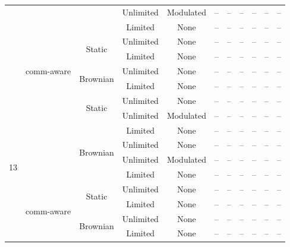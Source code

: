 \documentclass[conference]{IEEEtran}
\begin{document}
\begin{table}[ht]
\begin{tabular}{c|c|c|c|c|c|c|c|c|c|c}
  &   &          & Unlimited & Modulated & -- & -- & -- & -- & -- & -- \\
  &   &          & Limited   & None      & -- & -- & -- & -- & -- & -- \\
  \cmidrule{2-11}
  & \multirow{5}{*}{comm-aware}
    & \multirow{2}{*}{Static}
                 & Unlimited & None      & -- & -- & -- & -- & -- & -- \\
  &   &          & Limited   & None      & -- & -- & -- & -- & -- & -- \\
  \cmidrule{3-11}
  &   & \multirow{2}{*}{Brownian}
                 & Unlimited & None      & -- & -- & -- & -- & -- & -- \\
  &   &          & Limited   & None      & -- & -- & -- & -- & -- & -- \\
\midrule
\multirow{10}{*}{13}
  & \multirow{5}{*}{Stochastic}
    & \multirow{2}{*}{Static}
                 & Unlimited & None      & -- & -- & -- & -- & -- & -- \\
  &   &          & Unlimited & Modulated & -- & -- & -- & -- & -- & -- \\
  &   &          & Limited   & None      & -- & -- & -- & -- & -- & -- \\
  \cmidrule{3-11}
  &   & \multirow{2}{*}{Brownian}
                 & Unlimited & None      & -- & -- & -- & -- & -- & -- \\
  &   &          & Unlimited & Modulated & -- & -- & -- & -- & -- & -- \\
  &   &          & Limited   & None      & -- & -- & -- & -- & -- & -- \\
  \cmidrule{2-11}
  & \multirow{5}{*}{comm-aware}
    & \multirow{2}{*}{Static}
                 & Unlimited & None      & -- & -- & -- & -- & -- & -- \\
  &   &          & Limited   & None      & -- & -- & -- & -- & -- & -- \\
  \cmidrule{3-11}
  &   & \multirow{2}{*}{Brownian}
                 & Unlimited & None      & -- & -- & -- & -- & -- & -- \\
  &   &          & Limited   & None      & -- & -- & -- & -- & -- & -- \\
\bottomrule
\end{tabular}
\end{table}
\end{document}
